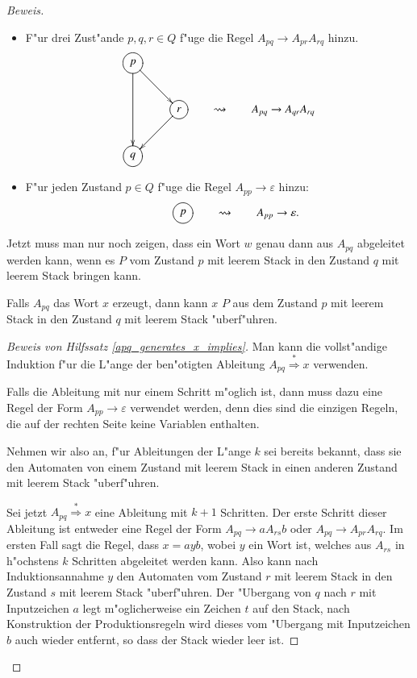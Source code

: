 \begin{proof}[Beweis]
\begin{itemize}
\item F"ur drei Zust"ande $p,q,r\in Q$ f"uge die Regel 
$A_{pq}\to A_{pr}A_{rq}$ hinzu.
\[
\begin{gathered}
\entrymodifiers={++[o][F]}
\xymatrix{
{p}\ar[dr]\ar[dd]
\\
*+\txt{}
	&{r}\ar[dl]
\\
{q}
}
\end{gathered}
\qquad\rightsquigarrow\qquad A_{pq}\to A_{qr}A_{rq}
\]
\item F"ur jeden Zustand $p\in Q$ f"uge die Regel $A_{pp}\to \varepsilon$
hinzu:
\[
\begin{gathered}
\entrymodifiers={++[o][F]}
\xymatrix{
*+\txt{}
	&{p}
}
\end{gathered}
\qquad\rightsquigarrow\qquad
A_{pp}\to\varepsilon.
\]
\end{itemize}
Jetzt muss man nur noch zeigen, dass ein Wort $w$ genau dann aus $A_{pq}$
abgeleitet werden kann, wenn es $P$ vom Zustand $p$ mit leerem Stack
in den Zustand $q$ mit leerem Stack bringen kann.

\begin{hilfssatz}\label{apq_generates_x_implies}
Falls $A_{pq}$ das Wort $x$ erzeugt, dann kann $x$ $P$ aus dem Zustand
$p$ mit leerem Stack in den Zustand $q$ mit leerem Stack "uberf"uhren.
\end{hilfssatz}

\begin{proof}[Beweis von Hilfssatz \ref{apq_generates_x_implies}]
Man kann die vollst"andige Induktion f"ur die L"ange der be\-n"otigten 
Ableitung $A_{pq}\overset{*}{\Rightarrow} x$ verwenden.

Falls die Ableitung mit nur einem Schritt m"oglich ist, dann muss
dazu eine Regel der Form $A_{pp}\to\varepsilon$ verwendet werden,
denn dies sind die einzigen Regeln, die auf der rechten Seite
keine Variablen enthalten. 

Nehmen wir also an, f"ur Ableitungen der L"ange $k$ sei bereits
bekannt, dass sie den Automaten von einem Zustand mit leerem Stack
in einen anderen Zustand mit leerem Stack "uberf"uhren.

Sei jetzt $A_{pq}\overset{*}{\Rightarrow}x$ eine Ableitung mit $k+1$
Schritten. Der erste Schritt dieser Ableitung ist entweder eine
Regel der Form $A_{pq}\to aA_{rs}b$ oder $A_{pq}\to A_{pr}A_{rq}$.
Im ersten Fall sagt die Regel, dass $x=ayb$, wobei $y$ ein
Wort ist, welches aus $A_{rs}$ in h"ochstens $k$ Schritten abgeleitet
werden kann. Also kann nach Induktionsannahme $y$ den Automaten vom
Zustand $r$ mit leerem Stack in den Zustand $s$ mit leerem Stack
"uberf"uhren. Der "Ubergang von $q$ nach $r$ mit Inputzeichen $a$
legt m"oglicherweise ein Zeichen $t$ auf den Stack, nach Konstruktion
der Produktionsregeln wird dieses vom "Ubergang mit Inputzeichen $b$
auch wieder entfernt, so dass der Stack wieder leer ist.


\end{proof}
\end{proof}
